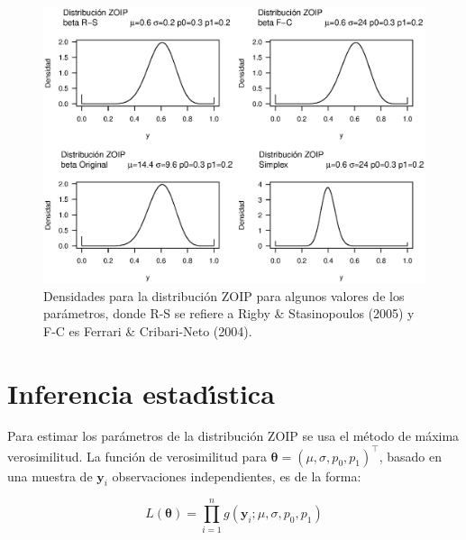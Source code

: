 \begin{figure}
	\begin{center}
		\includegraphics[scale=0.6]{Dist_ZOIP.eps}
		\caption{Densidades para la distribuci\'{o}n ZOIP para algunos valores de los par\'{a}metros, donde R-S se refiere a Rigby \& Stasinopoulos (2005) y F-C es Ferrari \& Cribari-Neto (2004).}
		\label{Dist_ZOIP}
	\end{center}
\end{figure}

\section{Inferencia estad\'{\i}stica}

Para estimar los par\'{a}metros de la distribuci\'{o}n ZOIP se usa el m\'{e}todo de m\'{a}xima verosimilitud. La funci\'{o}n de verosimilitud para $\boldsymbol{\theta}=(\mu, \sigma, p_0, p_1)^{\top}$, basado en una muestra de $\boldsymbol{y}_i$ observaciones independientes, es de la forma:

\begin{equation}
L(\boldsymbol{\theta})=\prod_{i=1}^{n}g(\mathbf{y}_i;\mu, \sigma, p_0, p_1) 
\label{F_likel}
\end{equation}



